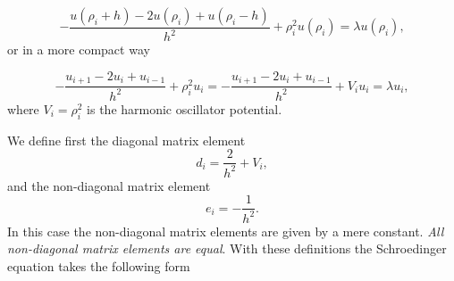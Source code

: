 \documentclass[%
oneside,                 %
final,                   %
10pt]{article}
\begin{document}
\[
-\frac{u(\rho_i+h) -2u(\rho_i) +u(\rho_i-h)}{h^2}+\rho_i^2u(\rho_i)  = \lambda u(\rho_i),
\]
or in  a more compact way

\[
-\frac{u_{i+1} -2u_i +u_{i-1}}{h^2}+\rho_i^2u_i=-\frac{u_{i+1} -2u_i +u_{i-1} }{h^2}+V_iu_i  = \lambda u_i,
\]
where $V_i=\rho_i^2$ is the harmonic oscillator potential.

We define first the diagonal matrix element
\begin{equation*}
   d_i=\frac{2}{h^2}+V_i,
\end{equation*}
and the non-diagonal matrix element
\begin{equation*}
   e_i=-\frac{1}{h^2}.
\end{equation*}
In this case the non-diagonal matrix elements are given by a mere constant.
\emph{All non-diagonal matrix elements are equal}.
With these definitions the Schroedinger equation takes the following form
\end{document}
